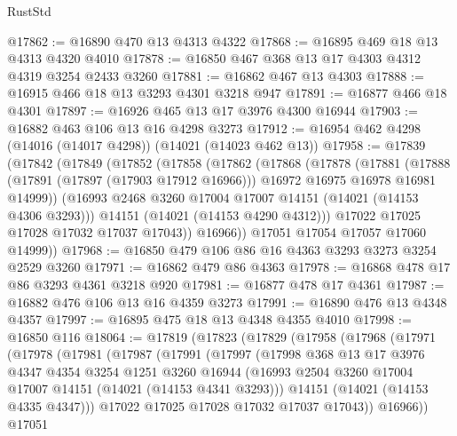 \begin{lexlean}{RustStd}
\begin{coremodule}
@17862 := @16890 @470 @13 @4313 @4322
@17868 := @16895 @469 @18 @13 @4313 @4320 @4010
@17878 := @16850 @467 @368 @13 @17 @4303 @4312 @4319 @3254 @2433 @3260
@17881 := @16862 @467 @13 @4303
@17888 := @16915 @466 @18 @13 @3293 @4301 @3218 @947
@17891 := @16877 @466 @18 @4301
@17897 := @16926 @465 @13 @17 @3976 @4300 @16944
@17903 := @16882 @463 @106 @13 @16 @4298 @3273
@17912 := @16954 @462 @4298 (@14016 (@14017 @4298)) (@14021 (@14023 @462 @13))
@17958 := @17839
    (@17842
      (@17849
        (@17852
          (@17858
            (@17862
              (@17868
                (@17878
                  (@17881
                    (@17888
                      (@17891 (@17897 (@17903 @17912 @16966)))
                      @16972
                      @16975
                      @16978
                      @16981
                      @14999))
                  (@16993 @2468 @3260 @17004 @17007 @14151 (@14021 (@14153 @4306 @3293)))
                  @14151
                  (@14021 (@14153 @4290 @4312)))
                @17022
                @17025
                @17028
                @17032
                @17037
                @17043))
            @16966))
        @17051
        @17054
        @17057
        @17060
        @14999))
@17968 := @16850 @479 @106 @86 @16 @4363 @3293 @3273 @3254 @2529 @3260
@17971 := @16862 @479 @86 @4363
@17978 := @16868 @478 @17 @86 @3293 @4361 @3218 @920
@17981 := @16877 @478 @17 @4361
@17987 := @16882 @476 @106 @13 @16 @4359 @3273
@17991 := @16890 @476 @13 @4348 @4357
@17997 := @16895 @475 @18 @13 @4348 @4355 @4010
@17998 := @16850 @116
@18064 := @17819
    (@17823
      (@17829
        (@17958
          (@17968
            (@17971
              (@17978
                (@17981
                  (@17987
                    (@17991
                      (@17997
                        (@17998
                          @368
                          @13
                          @17
                          @3976
                          @4347
                          @4354
                          @3254
                          @1251
                          @3260
                          @16944
                          (@16993 @2504 @3260 @17004 @17007 @14151 (@14021 (@14153 @4341 @3293)))
                          @14151
                          (@14021 (@14153 @4335 @4347)))
                        @17022
                        @17025
                        @17028
                        @17032
                        @17037
                        @17043))
                    @16966))
                @17051

\end{coremodule}
\end{lexlean}

